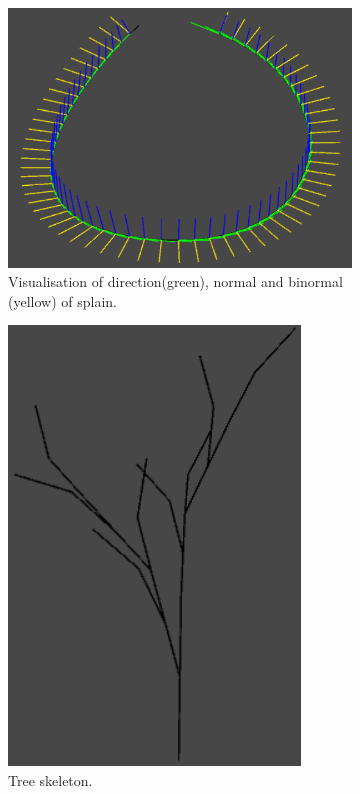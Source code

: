 \documentclass[b5paper,twoside,11pt]{article}
\begin{document}
\iffalse
\begin{figure}[!htbp] 

\begin{subfigure}{.5\textwidth}  
 \centering   
 \includegraphics[width=1.0\linewidth]
 {drawDirection} \caption{Visualisation of direction(green), normal and binormal (yellow) of splain.   \label{unity.drawDirection}} 
\end{subfigure} 
\begin{subfigure}{.5\textwidth}  
 \centering  
  \includegraphics[width=0.5\linewidth]{krzyweDrzewo} 
  \caption{Tree skeleton. \label{unity.krzyweDrzewo}} 
  \end{subfigure}
  \begin{subfigure}{.5\textwidth}

\end{subfigure}
\end{figure}
\end{document}
